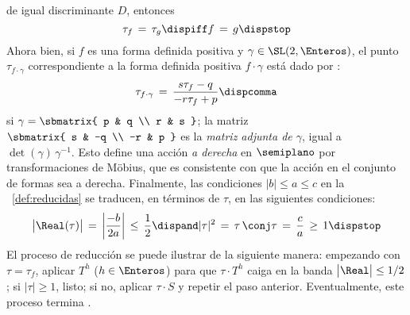 de igual discriminante $D$, entonces
\begin{displaymath}
	\tau_f\,=\,\tau_g\dispiff f\,=\,g\dispstop
\end{displaymath}
%
Ahora bien, si $f$ es una forma definida positiva y
$\gamma\in\SL(2,\Enteros)$, el punto $\tau_{f\cdot\gamma}$
correspondiente a la forma definida positiva $f\cdot\gamma$ est\'a dado por
\quedacomoejercicio:%
\begin{equation}
	\label{eq:definidas:accion:punto}
	\tau_{f\cdot\gamma}\,=\,\frac{s\tau_f-q}{-r\tau_f+p}
	\dispcomma
\end{equation}
%
si $\gamma=\sbmatrix{ p & q \\ r & s }$; la matriz
$\sbmatrix{ s & -q \\ -r & p }$ es la \emph{matriz adjunta de $\gamma$},
igual a $\det(\gamma)\,\gamma^{-1}$.
Esto define una acci\'on \emph{a derecha} en $\semiplano$ por
transformaciones de M\"obius, que es consistente con que la acci\'on en
el conjunto de formas sea a derecha.
Finalmente, las condiciones $|b|\leq a\leq c$ en la
~\ref{def:reducidas} se traducen, en t\'erminos de $\tau$, en las
siguientes condiciones:
\begin{equation}
	\label{eq:reducidas:semiplano}
	\big|\Real(\tau)\big| \,=\,
		\bigg|\frac{-b}{2a}\bigg|\,\leq\,\frac 1 2
		\dispand
	|\tau|^2 \,=\,\tau\,\conj\tau\,=\,\frac c a\,\geq\,1
	\dispstop
\end{equation}
%
El proceso de reducci\'on se puede ilustrar de la siguiente manera:
empezando con $\tau=\tau_f$, aplicar $T^h$ ($h\in\Enteros$) para que
$\tau\cdot T^h$ caiga en la banda $\big|\Real\big|\leq 1/2$;
si $|\tau|\geq 1$, listo; si no, aplicar $\tau\cdot S$ y repetir el
paso anterior. Eventualmente, este proceso termina \quedacomoejercicio.%
